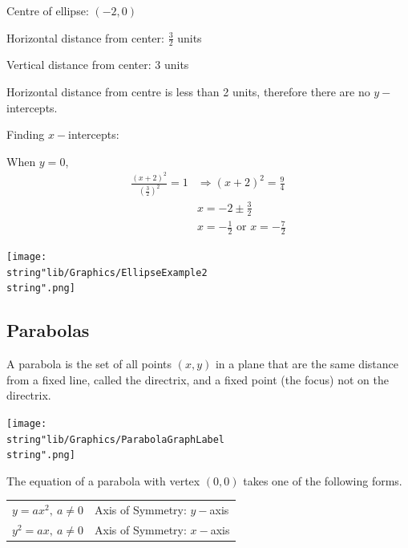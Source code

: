 \documentclass[11pt,a4paper]{book}
\begin{document}
\begin{example}{}
\begin{enumerate}[label=(\alph*)]
\begin{minipage}[t]{0.5\textwidth}
Centre of ellipse: $\left(-2,0\right)$

Horizontal distance from center: ${\displaystyle \frac{3}{2}}$ units

Vertical distance from center: $3$ units

Horizontal distance from centre is less than 2 units, therefore there
are no $y-$intercepts.

Finding $x-$intercepts:

When $y=0$,
\begin{align*}
{\displaystyle \frac{\left(x+2\right)^{2}}{\left(\frac{3}{2}\right)^{2}}=1} & \Rightarrow\left(x+2\right)^{2}=\frac{9}{4}\\
 & x=-2\pm\frac{3}{2}\\
 & x=-\frac{1}{2}\text{ or }x=-\frac{7}{2}
\end{align*}

\end{minipage}
\begin{minipage}[t]{0.5\textwidth}

\vspace{3cm}

\texttt{[image: \\string"lib/Graphics/EllipseExample2\\string".png]}

\end{minipage}

\end{enumerate}
\end{example}

\subsection{Parabolas}

A parabola is the set of all points $(x,y)$ in a plane that are the
same distance from a fixed line, called the directrix, and a fixed
point (the focus) not on the directrix.
\begin{center}
\texttt{[image: \\string"lib/Graphics/ParabolaGraphLabel\\string".png]}
\par\end{center}

\begin{tcolorbox}[colback=blue!5, colframe=black,boxrule=.4pt, sharpish corners]

The equation of a parabola with vertex $\left(0,0\right)$ takes one
of the following forms.
\begin{center}
\begin{tabular}{>{\raggedright}p{3cm}>{\raggedright}p{5cm}}
$y=ax^{2},\:a\neq0$ & Axis of Symmetry: $y-$axis

\medskip{}\tabularnewline
$y^{2}=ax,\:a\neq0$ & Axis of Symmetry: $x-$axis

\medskip{}\tabularnewline
\end{tabular}
\par\end{center}

\end{tcolorbox}
\end{document}
